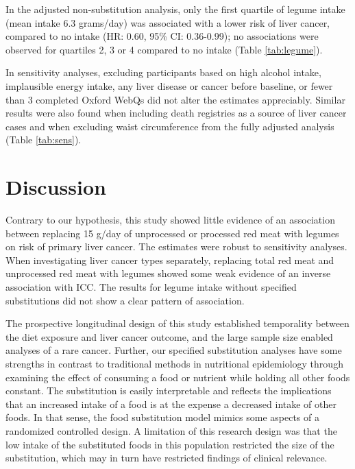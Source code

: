 \documentclass[nutrients,article,submit,moreauthors,pdftex]{Definitions/mdpi}
\begin{document}
In the adjusted non-substitution analysis, only the first quartile of
legume intake (mean intake 6.3 grams/day) was associated with a lower
risk of liver cancer, compared to no intake
(HR: 0.60, 95\% CI: 0.36-0.99);
no associations were observed for quartiles 2, 3 or 4 compared to no
intake (Table \ref{tab:legume}).

In sensitivity analyses, excluding participants based on high alcohol
intake, implausible energy intake, any liver disease or cancer before
baseline, or fewer than 3 completed Oxford WebQs did not alter the
estimates appreciably. Similar results were also found when including
death registries as a source of liver cancer cases and when excluding
waist circumference from the fully adjusted analysis (Table
\ref{tab:sens}).

\hypertarget{sec4}{%
\section{Discussion}\label{sec4}}

Contrary to our hypothesis, this study showed little evidence of an
association between replacing 15 g/day of unprocessed or processed red
meat with legumes on risk of primary liver cancer. The estimates were
robust to sensitivity analyses. When investigating liver cancer types
separately, replacing total red meat and unprocessed red meat with
legumes showed some weak evidence of an inverse association with ICC.
The results for legume intake without specified substitutions did not
show a clear pattern of association.

The prospective longitudinal design of this study established
temporality between the diet exposure and liver cancer outcome, and the
large sample size enabled analyses of a rare cancer. Further, our
specified substitution analyses have some strengths in contrast to
traditional methods in nutritional epidemiology through examining the
effect of consuming a food or nutrient while holding all other foods
constant. The substitution is easily interpretable and reflects the
implications that an increased intake of a food is at the expense a
decreased intake of other foods. In that sense, the food substitution
model mimics some aspects of a randomized controlled design. A
limitation of this research design was that the low intake of the
substituted foods in this population restricted the size of the
substitution, which may in turn have restricted findings of clinical
relevance.
\end{document}
